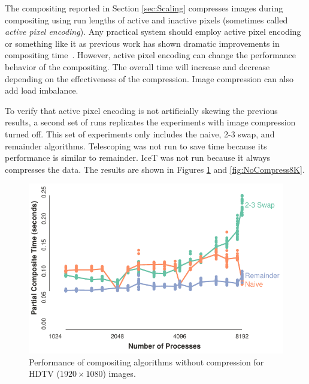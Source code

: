 \documentclass{vgtc}                          %
\newcommand*{\lcite}[1]{~\cite{#1}}
\newcommand*{\keyterm}[1]{\emph{#1}}
\newcommand{\textalgorithm}[1]{\textsf{#1}\xspace}
\newcommand{\ttswap}{\textalgorithm{2-3 swap}}
\newcommand{\naive}{\textalgorithm{naive}}
\newcommand{\Telescoping}{\textalgorithm{Telescoping}}
\newcommand{\remainder}{\textalgorithm{remainder}}
\begin{document}
The compositing reported in Section \ref{sec:Scaling} compresses images during compositing using run lengths of active and inactive pixels (sometimes called \keyterm{active pixel encoding}).
Any practical system should employ active pixel encoding or something like it as previous work has shown dramatic improvements in compositing time\lcite{Ahrens1998,Moreland2001}.
However, active pixel encoding can change the performance behavior of the compositing.
The overall time will increase and decrease depending on the effectiveness of the compression.
Image compression can also add load imbalance.

To verify that active pixel encoding is not artificially skewing the previous results, a second set of runs replicates the experiments with image compression turned off.
This set of experiments only includes the \naive, \ttswap, and \remainder algorithms.
\Telescoping was not run to save time because its performance is similar to \remainder.
IceT was not run because it always compresses the data.
The results are shown in Figures \ref{fig:NoCompressHDTV} and \ref{fig:NoCompress8K}.

\begin{figure}
  \centering
  \includegraphics[width=\linewidth]{no-compress-hdtv}
  \caption{
    Performance of compositing algorithms without compression for HDTV ($1920 \times 1080$) images.
  }
  \label{fig:NoCompressHDTV}
\end{figure}
\end{document}
